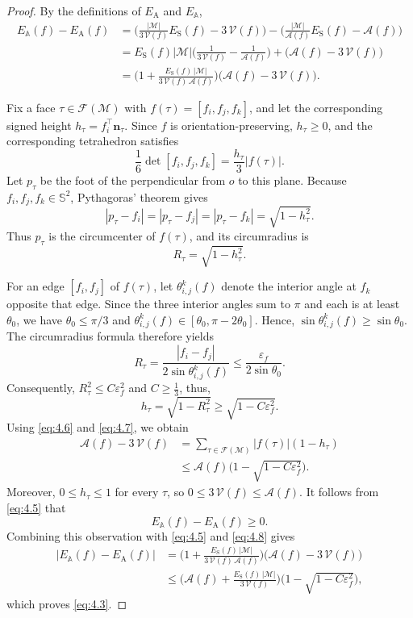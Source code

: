 \documentclass{article}
\numberwithin{equation}{section}
\def\n{\mathbf{n}}
\def\rS{\mathrm{S}}
\def\rA{\mathrm{A}}
\def\A{\mathcal{A}}
\def\bbA{\mathbb{A}}
\def\F{\mathcal{F}}
\def\M{\mathcal{M}}
\def\bV{\mathscr{V}}
\begin{document}
\begin{proof}
By the definitions of $E_\rA$ and $E_\bbA$,
\begin{align}
E_\bbA(f)-E_\rA(f)
&=\bigg(\frac{|\M|}{3\,\bV(f)}E_\rS(f)-3\,\bV(f)\bigg)
 -\bigg(\frac{|\M|}{\A(f)}E_\rS(f)-\A(f)\bigg) \nonumber\\
&=E_\rS(f)|\M|\bigg(\frac{1}{3\,\bV(f)}-\frac{1}{\A(f)}\bigg)
 +\Big(\A(f)-3\,\bV(f)\Big) \nonumber\\
&=\bigg(1+\frac{E_\rS(f)\,|\M|}{3\,\bV(f)\,\A(f)}\bigg)
  \Big(\A(f)-3\,\bV(f)\Big).
\label{eq:4.5}
\end{align}

Fix a face $\tau\in\F(\M)$ with $f(\tau)=[f_i,f_j,f_k]$, and let the corresponding signed height $h_\tau= f_i^\top \n_\tau$. Since $f$ is orientation-preserving, $h_\tau\geq0$, and the corresponding tetrahedron satisfies
\begin{equation}
\frac{1}{6}\det[f_i,f_j,f_k] =\frac{h_\tau}{3}|f(\tau)|.
\label{eq:4.6}
\end{equation}
Let $p_\tau$ be the foot of the perpendicular from $o$ to this plane. Because $f_i,f_j,f_k\in\mathbb{S}^2$, Pythagoras' theorem gives
\[
|p_\tau-f_i|=|p_\tau-f_j|=|p_\tau-f_k|=\sqrt{1-h_\tau^2}.
\]
Thus $p_\tau$ is the circumcenter of $f(\tau)$, and its circumradius is
\[
R_\tau=\sqrt{1-h_\tau^2}.
\]


For an edge $[f_i,f_j]$ of $f(\tau)$, let $\theta_{i,j}^k(f)$ denote the interior angle at $f_k$ opposite that edge. Since the three interior angles sum to $\pi$ and each is at least $\theta_0$, we have $\theta_0\leq\pi/3$ and $\theta_{i,j}^k(f)\in[\theta_0,\pi-2\theta_0]$. Hence, $\sin\theta_{i,j}^k(f)\geq\sin\theta_0$. The circumradius formula therefore yields
\[
R_\tau
=\frac{|f_i-f_j|}{2\sin\theta_{i,j}^k(f)}
\leq\frac{\varepsilon_f}{2\sin\theta_0}.
\]
Consequently, $R_\tau^2\leq C\varepsilon_f^2$ and $C \geq \frac{1}{3}$, thus,
\begin{equation}
h_\tau=\sqrt{1-R_\tau^2}
\geq\sqrt{1-C\varepsilon_f^2}.
\label{eq:4.7}
\end{equation}
Using \eqref{eq:4.6} and \eqref{eq:4.7}, we obtain
\begin{align}
\A(f)-3\,\bV(f)
&=\sum_{\tau\in\F(\M)}|f(\tau)|(1-h_\tau) \nonumber\\
&\leq\A(f)\Big(1-\sqrt{1-C\varepsilon_f^2}\Big).
\label{eq:4.8}
\end{align}
Moreover, $0\leq h_\tau\leq1$ for every $\tau$, so $0\leq3\,\bV(f)\leq\A(f)$. It follows from \eqref{eq:4.5} that
\[
E_\bbA(f)-E_\rA(f)\geq0.
\]
Combining this observation with \eqref{eq:4.5} and \eqref{eq:4.8} gives
\begin{align*}
\big|E_\bbA(f)-E_\rA(f)\big|
&=\bigg(1+\frac{E_\rS(f)\,|\M|}{3\,\bV(f)\,\A(f)}\bigg)
  \Big(\A(f)-3\,\bV(f)\Big)\\
&\leq\bigg(\A(f)+\frac{E_\rS(f)\,|\M|}{3\,\bV(f)}\bigg)
  \Big(1-\sqrt{1-C\varepsilon_f^2}\Big),
\end{align*}
which proves \eqref{eq:4.3}.


\end{proof}
\end{document}
